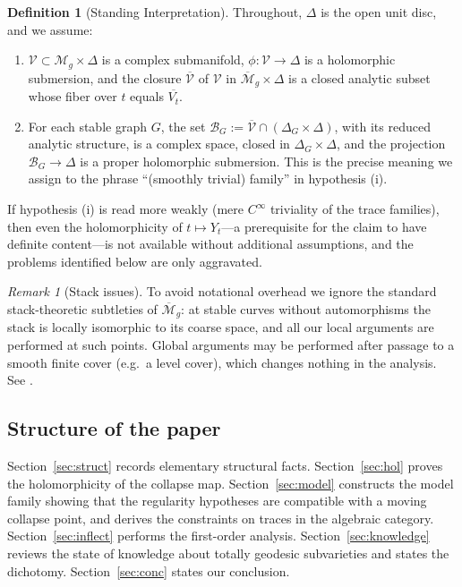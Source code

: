 \documentclass[11pt]{amsart}
\newcommand{\M}{\mathcal{M}}
\theoremstyle{plain}
\theoremstyle{definition}
\newtheorem{definition}[theorem]{Definition}
\theoremstyle{remark}
\newtheorem{remark}[theorem]{Remark}
\begin{document}
\begin{definition}[Standing Interpretation]\label{def:standing}
Throughout, $\Delta$ is the open unit disc, and we assume:
\begin{enumerate}
\item[$(\alpha)$] $\mathcal V\subset \M_g\times\Delta$ is a complex submanifold,
$\phi:\mathcal V\to\Delta$ is a holomorphic submersion, and the closure
$\overline{\mathcal V}$ of $\mathcal V$ in $\overline{\M}_g\times\Delta$ is a closed
analytic subset whose fiber over $t$ equals $\overline{V_t}$.
\item[$(\beta)$] For each stable graph $G$, the set
$\mathcal B_G:=\overline{\mathcal V}\cap(\Delta_G\times\Delta)$, with its reduced
analytic structure, is a complex space, closed in $\Delta_G\times\Delta$, and the
projection $\mathcal B_G\to\Delta$ is a proper holomorphic submersion. This is the
precise meaning we assign to the phrase ``(smoothly trivial) family'' in hypothesis (i).
\end{enumerate}
If hypothesis (i) is read more weakly (mere $C^\infty$ triviality of the trace
families), then even the holomorphicity of $t\mapsto Y_t$---a prerequisite for the
claim to have definite content---is not available without additional assumptions,
and the problems identified below are only aggravated.
\end{definition}

\begin{remark}[Stack issues]
To avoid notational overhead we ignore the standard stack-theoretic subtleties of
$\overline{\M}_g$: at stable curves without automorphisms the stack is locally
isomorphic to its coarse space, and all our local arguments are performed at such
points. Global arguments may be performed after passage to a smooth finite cover
(e.g.\ a level cover), which changes nothing in the analysis. See
\cite{DM, Knudsen}.
\end{remark}

\subsection*{Structure of the paper}

Section~\ref{sec:struct} records elementary structural facts.
Section~\ref{sec:hol} proves the holomorphicity of the collapse map.
Section~\ref{sec:model} constructs the model family showing that the regularity
hypotheses are compatible with a moving collapse point, and derives the constraints
on traces in the algebraic category. Section~\ref{sec:inflect} performs the
first-order analysis. Section~\ref{sec:knowledge} reviews the state of knowledge
about totally geodesic subvarieties and states the dichotomy.
Section~\ref{sec:conc} states our conclusion.
\end{document}
